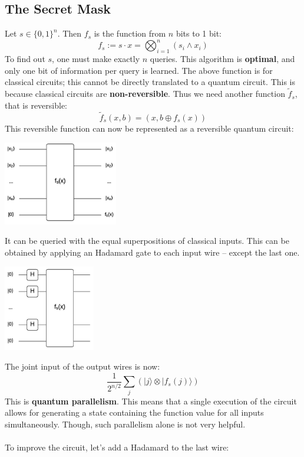 \documentclass{article}
\begin{document}
\subsection{The Secret Mask}
Let $s \in \{ 0,1 \}^n$. Then $f_s$ is the function from $n$ bits to 1 bit:
\[ f_s := s \cdot x = \displaystyle\bigotimes^n_{i=1}(s_i \wedge x_i) \]
To find out $s$, one must make exactly $n$ queries. This algorithm is \textbf{optimal}, and only one bit of information per query is learned. The above function is for classical circuits; this cannot be directly translated to a quantum circuit. This is because classical circuits are \textbf{non-reversible}. Thus we need another function $\tilde f_s$, that is reversible:
\[ \tilde f_s (x, b) = (x, b \oplus f_s(x)) \]
This reversible function can now be represented as a reversible quantum circuit:
\begin{center}
	\includegraphics[width=5cm]{assets/circuit1.png}
\end{center}
It can be queried with the equal superpositions of classical inputs. This can be obtained by applying an Hadamard gate to each input wire -- except the last one.
\begin{center}
	\includegraphics[width=4cm]{assets/circuit2.png}
\end{center}
The joint input of the output wires is now:
\[ \displaystyle\frac{1}{2^{n/2}} \sum_j (|j\rangle \otimes |f_s(j)\rangle) \]
This is \textbf{quantum parallelism}. This means that a single execution of the circuit allows for generating a state containing the function value for all inputs simultaneously. Though, such parallelism alone is not very helpful. \\ \\
To improve the circuit, let's add a Hadamard to the last wire:
\end{document}
